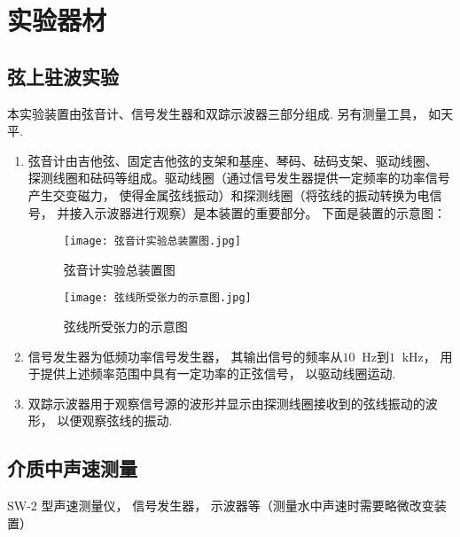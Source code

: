 \documentclass[11pt]{article}
\newcommand*{\unit}[1]{\mathop{}\!\mathrm{#1}}
\begin{document}
\section{实验器材}

\subsection{弦上驻波实验}
本实验装置由弦音计、信号发生器和双踪示波器三部分组成. 另有测量工具， 如天平. 

\begin{enumerate}

    \item 弦音计由吉他弦、固定吉他弦的支架和基座、琴码、砝码支架、驱动线圈、
    探测线圈和砝码等组成。驱动线圈（通过信号发生器提供一定频率的功率信号产生交变磁力， 
    使得金属弦线振动）和探测线圈（将弦线的振动转换为电信号， 并接入示波器进行观察）是本装置的重要部分。
    下面是装置的示意图：
    
    \begin{figure}[htb]
        \begin{minipage}[t]{0.6\linewidth}
            \centering
            \texttt{[image: 弦音计实验总装置图.jpg]}
            \caption{弦音计实验总装置图}
        \end{minipage}
        \begin{minipage}[t]{0.39\linewidth}
            \centering
            \texttt{[image: 弦线所受张力的示意图.jpg]}
            \caption{弦线所受张力的示意图}
        \end{minipage}
    \end{figure}
    
    
    \item 信号发生器为低频功率信号发生器， 其输出信号的频率从$10\unit{Hz}$到$1\unit{kHz}$， 用于提供上述频率范围中具有一定功率的正弦信号， 以驱动线圈运动. 
	
    \item 双踪示波器用于观察信号源的波形并显示由探测线圈接收到的弦线振动的波形， 以便观察弦线的振动. 

\end{enumerate}

\subsection{介质中声速测量}

SW-2 型声速测量仪， 信号发生器， 示波器等（测量水中声速时需要略微改变装置）
\end{document}
